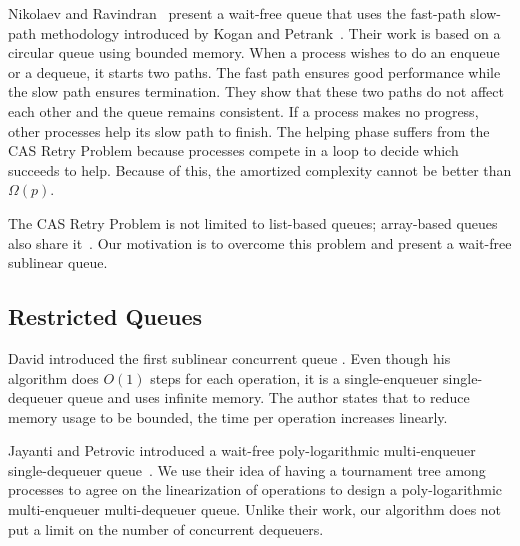 Nikolaev and Ravindran~\cite{10.1145/3490148.3538572} present a
wait-free queue that uses the fast-path slow-path methodology
introduced by Kogan and Petrank~\cite{10.1145/2370036.2145835}. Their
work is based on a circular queue using bounded memory. When a process
wishes to do an enqueue or a dequeue, it starts two paths. The fast
path  ensures good performance while the slow path ensures
termination. They show that these two paths do not affect each other
and the queue remains consistent. If a process makes no progress,
other processes help its slow path to finish. The helping phase
suffers from the CAS Retry Problem because processes compete in a
 loop to decide which succeeds to help. Because of this, the
amortized complexity cannot be better than $\Omega(p)$. 

The CAS Retry Problem is not limited to list-based queues; array-based
queues also share
it~\cite{DBLP:conf/iceccs/ColvinG05,DBLP:conf/icdcn/Shafiei09,DBLP:conf/spaa/TsigasZ01}.
Our motivation is to overcome this problem and present a wait-free
sublinear queue. 

\subsection{Restricted Queues}

David introduced the first sublinear concurrent queue
\cite{DBLP:conf/wdag/David04}. Even though his algorithm does $O(1)$
steps for each operation, it is a single-enqueuer single-dequeuer
queue and uses infinite memory. 
The author states that to reduce memory usage to be bounded, the time
per operation increases linearly. 

Jayanti and Petrovic introduced a wait-free poly-logarithmic
multi-enqueuer single-dequeuer
queue~\cite{DBLP:conf/fsttcs/JayantiP05}. We use their idea of having
a tournament tree among processes to agree on the linearization of
operations to design a poly-logarithmic multi-enqueuer multi-dequeuer
queue. Unlike their work, our algorithm does not put a limit on the
number of concurrent dequeuers.  

